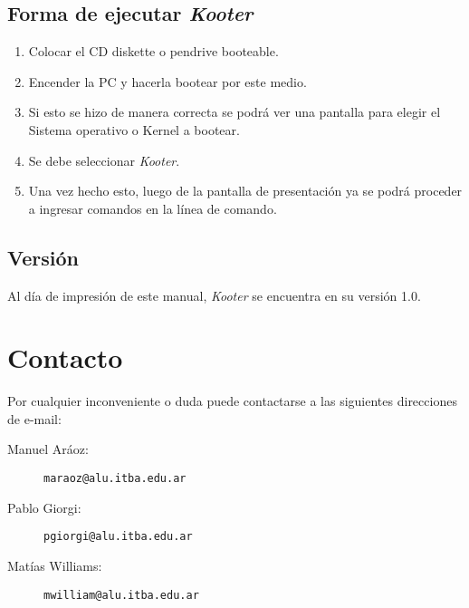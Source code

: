\documentclass[a4paper,11pt]{article}
\begin{document}
\subsection{Forma de ejecutar \emph{Kooter}}
\begin{enumerate}
	\item Colocar el CD diskette o pendrive booteable.
	\item Encender la PC y hacerla bootear por este medio.
	\item Si esto se hizo de manera correcta se podrá ver una pantalla para elegir el Sistema operativo o Kernel a bootear.
	\item Se debe seleccionar \emph{Kooter}.
	\item Una vez hecho esto, luego de la pantalla de presentación ya se podrá proceder a ingresar comandos en la línea de comando.
\end{enumerate}

\subsection{Versión}
Al día de impresión de este manual, \emph{Kooter} se encuentra en su versión 1.0.

\newpage

\section{Contacto}
Por cualquier inconveniente o duda puede contactarse a las siguientes direcciones de e-mail:
\begin{description}
	\item[Manuel Aráoz:]  \texttt{maraoz@alu.itba.edu.ar}
	\item[Pablo Giorgi:]  \texttt{pgiorgi@alu.itba.edu.ar}
	\item[Matías Williams:]  \texttt{mwilliam@alu.itba.edu.ar}
\end{description}
\end{document}
